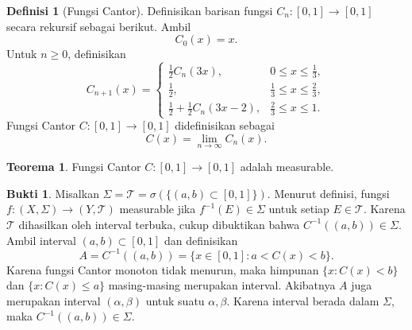 \documentclass{article}
\theoremstyle{definition}
\newtheorem*{teorema}{Teorema}
\newtheorem*{definisi}{Definisi}
\newtheorem*{bukti}{Bukti}
\begin{document}
\begin{definisi}[Fungsi Cantor]
  Definisikan barisan fungsi $C_n:[0,1]\to[0,1]$ secara rekursif sebagai berikut. Ambil
  \[
    C_0(x)=x.
  \]
  Untuk $n\ge0$, definisikan
  \[
    C_{n+1}(x)=
    \begin{cases}
      \frac12 C_n(3x),           & 0\le x\le \frac13,       \\
      \frac12,                   & \frac13\le x\le \frac23, \\
      \frac12+\frac12 C_n(3x-2), & \frac23\le x\le1.
    \end{cases}
  \]
  Fungsi Cantor $C:[0,1]\to[0,1]$ didefinisikan sebagai
  \[
    C(x)=\lim_{n\to\infty}C_n(x).
  \]
\end{definisi}

\begin{teorema}
  Fungsi Cantor $C:[0,1]\to[0,1]$ adalah measurable.
\end{teorema}

\begin{bukti}
  Misalkan $\Sigma=\mathcal T=\sigma(\{(a,b)\subset[0,1]\})$.
  Menurut definisi, fungsi $f:(X,\Sigma)\to(Y,\mathcal T)$
  measurable jika $f^{-1}(E)\in\Sigma$ untuk setiap $E\in\mathcal T$. Karena $\mathcal T$ dihasilkan oleh interval terbuka,
  cukup dibuktikan bahwa $C^{-1}((a,b))\in\Sigma$. Ambil interval $(a,b)\subset[0,1]$ dan definisikan
  \[
    A=C^{-1}((a,b))=\{x\in[0,1]:a<C(x)<b\}.
  \]
  Karena fungsi Cantor monoton tidak menurun,
  maka himpunan $\{x:C(x)<b\}$ dan $\{x:C(x)\le a\}$
  masing-masing merupakan interval.
  Akibatnya $A$ juga merupakan interval $(\alpha,\beta)$
  untuk suatu $\alpha,\beta$. Karena interval berada dalam $\Sigma$,
  maka $C^{-1}((a,b))\in\Sigma$.
\end{bukti}
\end{document}
